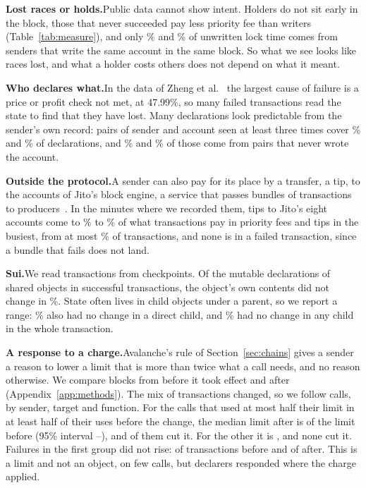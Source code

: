 \documentclass[conference,compsoc]{IEEEtran}
\numberwithin{equation}{section}
\theoremstyle{plain}
\theoremstyle{definition}
\theoremstyle{remark}
\newcommand{\runin}[1]{\par\smallskip\noindent\textbf{#1.}\enspace}
\begin{document}
\runin{Lost races or holds}Public data cannot show intent. Holders do not sit early in the block, those that never succeeded pay less priority fee than writers (Table~\ref{tab:measure}), and only \sameBlockA\% and \sameBlockB\% of unwritten lock time comes from senders that write the same account in the same block. So what we see looks like races lost, and what a holder costs others does not depend on what it meant.

\runin{Who declares what}In the data of Zheng et al.~\cite{zheng2025why} the largest cause of failure is a price or profit check not met, at 47.99\%, so many failed transactions read the state to find that they have lost. Many declarations look predictable from the sender's own record: pairs of sender and account seen at least three times cover \pairCoverA\% and \pairCoverB\% of declarations, and \qZeroA\% and \qZeroB\% of those come from pairs that never wrote the account.

\runin{Outside the protocol}A sender can also pay for its place by a transfer, a tip, to the accounts of Jito's block engine, a service that passes bundles of transactions to producers~\cite{jitodocs}. In the \nTipMinutes{} minutes where we recorded them, tips to Jito's eight accounts come to \winTipShareMin\% to \winTipShareMax\% of what transactions pay in priority fees and tips in the busiest, from at most \winTipTxMax\% of transactions, and none is in a failed transaction, since a bundle that fails does not land.

\runin{Sui}We read \suiTx{} transactions from \suiCheckpoints{} checkpoints. Of the \suiMutable{} mutable declarations of shared objects in successful transactions, the object's own contents did not change in \suiHi\%. State often lives in child objects under a parent, so we report a range: \suiMid\% also had no change in a direct child, and \suiLo\% had no change in any child in the whole transaction.

\runin{A response to a charge}Avalanche's rule of Section~\ref{sec:chains} gives a sender a reason to lower a limit that is more than twice what a call needs, and no reason otherwise. We compare blocks from before it took effect and after (Appendix~\ref{app:methods}). The mix of transactions changed, so we follow calls, by sender, target and function. For the \avaxExposedCalls{} calls that used at most half their limit in at least half of their uses before the change, the median limit after is \avaxExposedRatio{} of the limit before (95\% interval \avaxExposedLo--\avaxExposedHi), and \avaxExposedCut{} of them cut it. For the other \avaxUnexposedCalls{} it is \avaxUnexposedRatio{}, and none cut it. Failures in the first group did not rise: \avaxFailBefore{} of \avaxTxBefore{} transactions before and \avaxFailAfter{} of \avaxTxAfter{} after. This is a limit and not an object, on few calls, but declarers responded where the charge applied.
\end{document}
